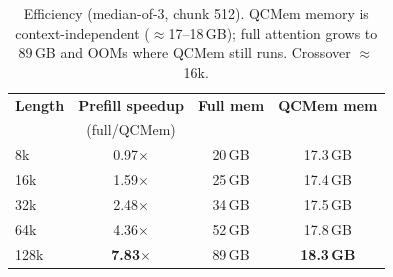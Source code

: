 \begin{table}[t]
\centering
\small
\begin{tabular}{@{}lccc@{}}
\toprule
\textbf{Length} & \textbf{Prefill speedup} & \textbf{Full mem} & \textbf{QCMem mem} \\
 & (full/QCMem) & & \\
\midrule
8k & 0.97$\times$ & 20\,GB & 17.3\,GB \\
16k & 1.59$\times$ & 25\,GB & 17.4\,GB \\
32k & 2.48$\times$ & 34\,GB & 17.5\,GB \\
64k & 4.36$\times$ & 52\,GB & 17.8\,GB \\
128k & \textbf{7.83}$\times$ & 89\,GB & \textbf{18.3\,GB} \\
\bottomrule
\end{tabular}
\caption{Efficiency (median-of-3, chunk 512). QCMem memory is context-independent ($\approx$17--18\,GB); full attention grows to 89\,GB and OOMs where QCMem still runs. Crossover $\approx$16k.}
\label{tab:eff}
\end{table}
